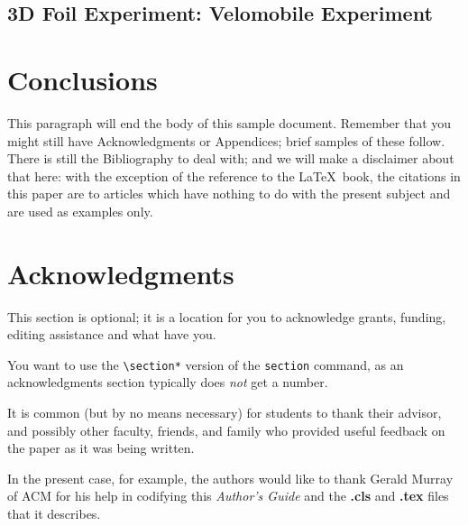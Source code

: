 \documentclass{sig-alternate}
\begin{document}
\subsection{3D Foil Experiment: Velomobile Experiment}
\label{3DFoilExperiment}

\section{Conclusions}
\label{sec:conclusions}

This paragraph will end the body of this sample document.
Remember that you might still have Acknowledgments or
Appendices; brief samples of these
follow.  There is still the Bibliography to deal with; and
we will make a disclaimer about that here: with the exception
of the reference to the \LaTeX\ book, the citations in
this paper are to articles which have nothing to
do with the present subject and are used as
examples only.

\section*{Acknowledgments}
\label{sec:acknowledgments}

This section is optional; it is a location for you
to acknowledge grants, funding, editing assistance and
what have you.

You want to use the \texttt{\textbackslash section*} version of the \texttt{section}
command, as an acknowledgments section typically does \emph{not} get
a number.

It is common (but by no means necessary) for students to thank
their advisor, and possibly other faculty, friends, and family who provided
useful feedback on the paper as it was being written.

In the present case, for example, the
authors would like to thank Gerald Murray of ACM for
his help in codifying this \textit{Author's Guide}
and the \textbf{.cls} and \textbf{.tex} files that it describes.


  
\end{document}
